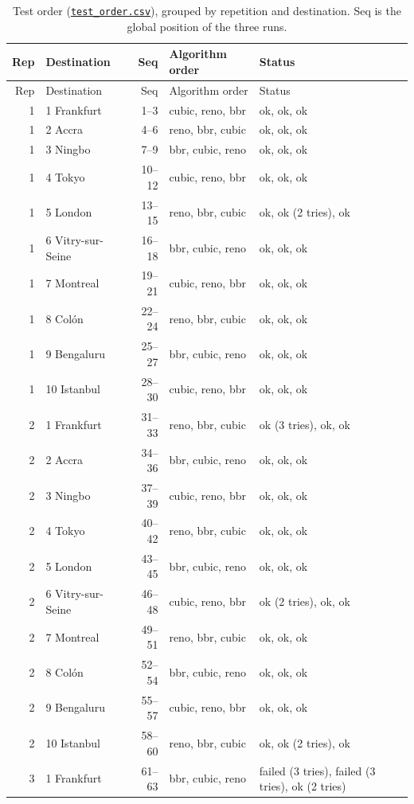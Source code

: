 \documentclass[10pt]{article}
\newcommand{\repo}{https://github.com/philwisniewski/cs-422-assignment-2}
\newcommand{\commit}{d1408ba303b1e3132ba5504e32ebf2ed3572d4e0}
\newcommand{\resurl}{\repo/tree/\commit/results/20261022-222609}
\begin{document}
\begin{center}\small
\begin{longtable}{@{}rlrll@{}}
\caption{Test order (\href{\resurl/test_order.csv}{\texttt{test\_order.csv}}), grouped by repetition and destination. Seq is the global position of the three runs.}\\
\toprule
Rep & Destination & Seq & Algorithm order & Status \\
\midrule
\endfirsthead
\toprule
Rep & Destination & Seq & Algorithm order & Status \\
\midrule
\endhead
1 & 1 Frankfurt & 1--3 & cubic, reno, bbr & ok, ok, ok \\
1 & 2 Accra & 4--6 & reno, bbr, cubic & ok, ok, ok \\
1 & 3 Ningbo & 7--9 & bbr, cubic, reno & ok, ok, ok \\
1 & 4 Tokyo & 10--12 & cubic, reno, bbr & ok, ok, ok \\
1 & 5 London & 13--15 & reno, bbr, cubic & ok, ok (2 tries), ok \\
1 & 6 Vitry-sur-Seine & 16--18 & bbr, cubic, reno & ok, ok, ok \\
1 & 7 Montreal & 19--21 & cubic, reno, bbr & ok, ok, ok \\
1 & 8 Colón & 22--24 & reno, bbr, cubic & ok, ok, ok \\
1 & 9 Bengaluru & 25--27 & bbr, cubic, reno & ok, ok, ok \\
1 & 10 Istanbul & 28--30 & cubic, reno, bbr & ok, ok, ok \\
2 & 1 Frankfurt & 31--33 & reno, bbr, cubic & ok (3 tries), ok, ok \\
2 & 2 Accra & 34--36 & bbr, cubic, reno & ok, ok, ok \\
2 & 3 Ningbo & 37--39 & cubic, reno, bbr & ok, ok, ok \\
2 & 4 Tokyo & 40--42 & reno, bbr, cubic & ok, ok, ok \\
2 & 5 London & 43--45 & bbr, cubic, reno & ok, ok, ok \\
2 & 6 Vitry-sur-Seine & 46--48 & cubic, reno, bbr & ok (2 tries), ok, ok \\
2 & 7 Montreal & 49--51 & reno, bbr, cubic & ok, ok, ok \\
2 & 8 Colón & 52--54 & bbr, cubic, reno & ok, ok, ok \\
2 & 9 Bengaluru & 55--57 & cubic, reno, bbr & ok, ok, ok \\
2 & 10 Istanbul & 58--60 & reno, bbr, cubic & ok, ok (2 tries), ok \\
3 & 1 Frankfurt & 61--63 & bbr, cubic, reno & failed (3 tries), failed (3 tries), ok (2 tries) \\

\end{longtable}
\end{center}
\end{document}
